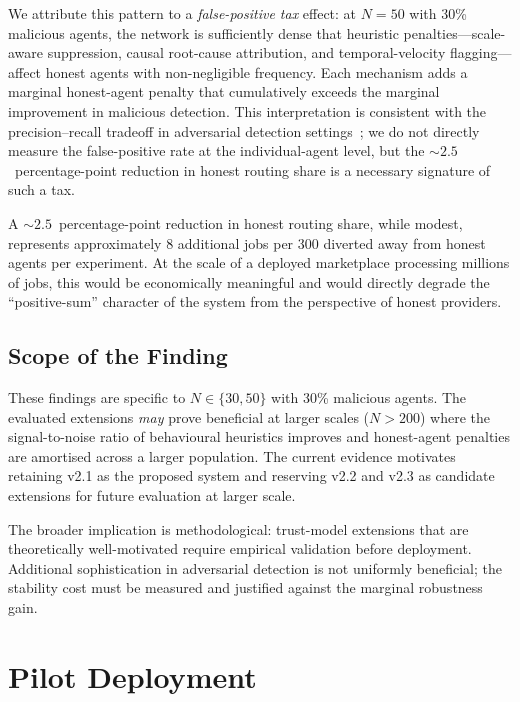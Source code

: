 \documentclass[sigconf,nonacm,10pt]{acmart}
\begin{document}
We attribute this pattern to a \emph{false-positive tax} effect:
at $N{=}50$ with 30\% malicious agents, the network is
sufficiently dense that heuristic penalties---scale-aware
suppression, causal root-cause attribution, and temporal-velocity
flagging---affect honest agents with non-negligible frequency.
Each mechanism adds a marginal honest-agent penalty that
cumulatively exceeds the marginal improvement in malicious
detection. This interpretation is consistent with the
precision--recall tradeoff in adversarial detection
settings~\cite{davis2006relationship}; we do not directly measure
the false-positive rate at the individual-agent level, but the
$\sim 2.5$~percentage-point reduction in honest routing share is a
necessary signature of such a tax.

A $\sim 2.5$~percentage-point reduction in honest routing share, while
modest, represents approximately 8 additional jobs per 300
diverted away from honest agents per experiment. At the scale of
a deployed marketplace processing millions of jobs, this would be
economically meaningful and would directly degrade the
``positive-sum'' character of the system from the perspective of
honest providers.

\subsection{Scope of the Finding}

These findings are specific to $N \in \{30, 50\}$ with 30\%
malicious agents. The evaluated extensions \emph{may} prove
beneficial at larger scales ($N > 200$) where the
signal-to-noise ratio of behavioural heuristics improves and
honest-agent penalties are amortised across a larger population.
The current evidence motivates retaining v2.1 as the proposed
system and reserving v2.2 and v2.3 as candidate extensions for
future evaluation at larger scale.

The broader implication is methodological: trust-model extensions
that are theoretically well-motivated require empirical validation
before deployment. Additional sophistication in adversarial
detection is not uniformly beneficial; the stability cost must be
measured and justified against the marginal robustness gain.

\section{Pilot Deployment}
\label{sec:deployment}
\end{document}
